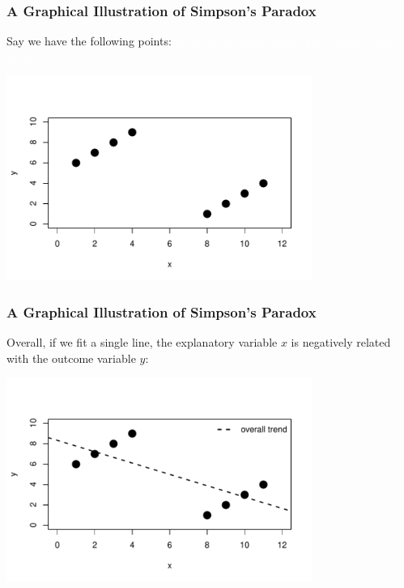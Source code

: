 \documentclass[handout]{beamer}
\newcommand{\blue}[1]{\textcolor{blue2}{#1}}
\begin{document}
\begin{frame}
\frametitle{A Graphical Illustration of Simpson's Paradox}
Say we have the following points: \textcolor{white}{lorem ipsum lorem ipsum lorem ipsum lorem ipsum}
\begin{center}
\includegraphics[width=10cm]{figure/simpsons1.pdf}
\end{center}

\end{frame}



\begin{frame}
\frametitle{A Graphical Illustration of Simpson's Paradox}
Overall, if we fit a single line, the explanatory variable $x$ is \blue{negatively} related with the outcome variable $y$:
\begin{center}
\includegraphics[width=10cm]{figure/simpsons2.pdf}
\end{center}

\end{frame}
\end{document}
